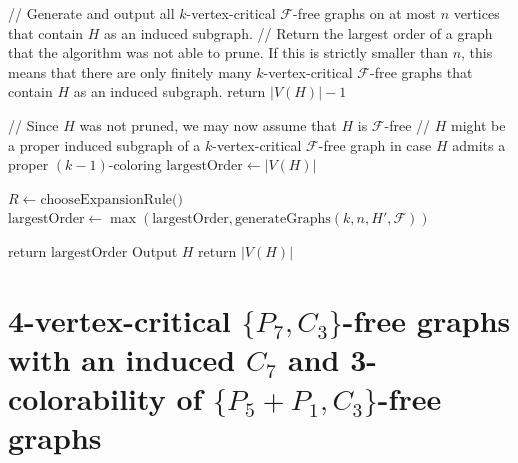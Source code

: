 \documentclass[11pt,a4paper]{article}
\theoremstyle{definition}
\begin{document}
\begin{algorithm}[ht!b]
\caption{generateGraphs(Integer $k$, Integer $n$, Set of graphs $\mathcal{F}$, Induced graph $H$)}
\label{algo:genGraphs}
  \begin{algorithmic}[1]
		\STATE // Generate and output all $k$-vertex-critical $\mathcal{F}$-free graphs on at most $n$ vertices that contain $H$ as an induced subgraph.
        \STATE // Return the largest order of a graph that the algorithm was not able to prune. If this is strictly smaller than $n$, this means that there are only finitely many $k$-vertex-critical $\mathcal{F}$-free graphs that contain $H$ as an induced subgraph.
            \STATE return $|V(H)|-1$
        \ENDIF
        
        \STATE // Since $H$ was not pruned, we may now assume that $H$ is $\mathcal{F}$-free
        \STATE // $H$ might be a proper induced subgraph of a $k$-vertex-critical $\mathcal{F}$-free graph in case $H$ admits a proper $(k-1)$-coloring
            \STATE $\text{largestOrder} \gets |V(H)|$

                \STATE $R \gets \text{chooseExpansionRule()}$
                    \STATE $\text{largestOrder} \gets \max(\text{largestOrder},\text{generateGraphs}(k,n,H',\mathcal{F}))$
                \ENDFOR
            \ENDIF
            
            \STATE return $\text{largestOrder}$
        \ELSE
                \STATE Output $H$
            \ENDIF
            \STATE return $|V(H)|$
        \ENDIF
        

  \end{algorithmic}
\end{algorithm}

\section{4-vertex-critical $\{P_7,C_3\}$-free graphs with an induced $C_7$ and 3-colorability of $\{P_5+P_1,C_3\}$-free graphs}\label{sec:inducedC7}
\end{document}
